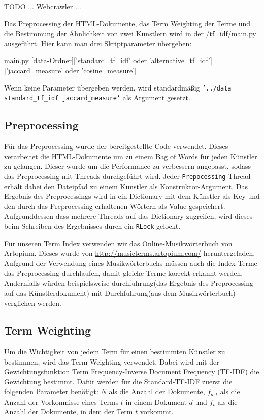 \documentclass[prodmode,acmtecs]{acmsmall} %
\begin{document}
TODO ... Webcrawler ...


Das Preprocessing der HTML-Dokumente, das Term Weighting der Terme und die Bestimmung der Ähnlichkeit von zwei Künstlern wird in der /tf\_idf/main.py ausgeführt.
Hier kann man drei Skriptparameter übergeben: 
\begin{python}
main.py [data-Ordner]['standard_tf_idf' oder 'alternative_tf_idf']
['jaccard_measure' oder 'cosine_measure']
\end{python}
Wenn keine Parameter übergeben werden, wird standardmäßig \texttt{'../data standard\_tf\_idf jaccard\_measure'} als Argument gesetzt. 


\subsection{Preprocessing}
Für das Preprocessing wurde der bereitgestellte Code verwendet. Dieses verarbeitet die HTML-Dokumente um zu einem Bag of Words für jeden Künstler zu gelangen. Dieser wurde um die Performance zu verbessern angepasst, sodass das Preprocessing mit Threads durchgeführt wird. Jeder \texttt{Prepocessing}-Thread erhält dabei den Dateipfad zu einem Künstler als Konstruktor-Argument. Das Ergebnis des Preprocessings wird in ein Dictionary mit dem Künstler als Key und den durch das Preprocessing erhaltenen Wörtern als Value gespeichert. Aufgrunddessen dass mehrere Threads auf das Dictionary zugreifen, wird dieses beim Schreiben des Ergebnisses durch ein \texttt{RLock} gelockt.

Für unseren Term Index verwenden wir das Online-Musikwörterbuch von Artopium. Dieses wurde von \url{http://musicterms.artopium.com/} heruntergeladen.
Aufgrund der Verwendung eines Musikwörterbuchs müssen auch die Index Terme das Preprocessing durchlaufen, damit gleiche Terme korrekt erkannt werden. Andernfalls würden beispielsweise \glqq durchfuhrung\grqq (das Ergebnis des Preprocessing auf das Künstlerdokument) mit \glqq Durchfuhrung\grqq (aus dem Musikwörterbuch) verglichen werden.

\subsection{Term Weighting}
Um die Wichtigkeit von jedem Term für einen bestimmten Künstler zu bestimmen, wird das Term Weighting verwendet. Dabei wird mit der Gewichtungsfunktion Term Frequency-Inverse Document Frequency (TF-IDF) die Gewichtung bestimmt. Dafür werden für die Standard-TF-IDF zuerst die folgenden Parameter benötigt: $N$ als die Anzahl der Dokumente, $f_{d,t}$ als die Anzahl der Vorkomnisse eines Terms $t$ in einem Dokument $d$ und $f_t$ als die Anzahl der Dokumente, in dem der Term $t$ vorkommt. 
\end{document}
